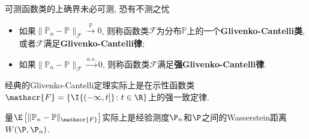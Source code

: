 可测函数类的上确界未必可测, 恐有不测之忧

\begin{itemize}
	\item 如果$\|\mathbb{P}_n - \mathbb{P}\|_{\mathscr{F}} \stackrel{\mathbb{P}}{\to} 0$, 则称函数类$\mathscr{F}$为分布$\mathbb{P}$上的一个\textbf{Glivenko-Cantelli类}, 或者$\mathscr{F}$满足\textbf{Glivenko-Cantelli律}; 
	\item 如果$\|\mathbb{P}_n - \mathbb{P}\|_{\mathscr{F}} \stackrel{a.s.}{\to} 0$, 则称函数类$\mathscr{F}$满足\textbf{强Glivenko-Cantelli律}. 
\end{itemize}
经典的Glivenko-Cantelli定理实际上是在示性函数类$\mathscr{F} = \{\I{(- \infty, t]} \colon t \in \R \}$上的强一致定律. 

量$\E\left[\|\mathbb{P}_n - \mathbb{P}\|_{\mathscr{F}}\right]$实际上是经验测度$\P_n$和$\P$之间的Wasserstein距离$W(\P, \P_n)$. 

